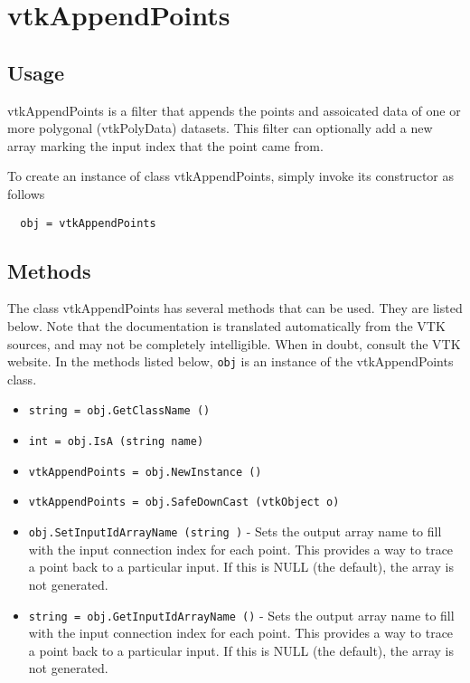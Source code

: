\section{vtkAppendPoints}

\subsection{Usage}

 vtkAppendPoints is a filter that appends the points and assoicated data
 of one or more polygonal (vtkPolyData) datasets. This filter can optionally 
 add a new array marking the input index that the point came from.

To create an instance of class vtkAppendPoints, simply
invoke its constructor as follows
\begin{verbatim}
  obj = vtkAppendPoints
\end{verbatim}
\subsection{Methods}

The class vtkAppendPoints has several methods that can be used.
  They are listed below.
Note that the documentation is translated automatically from the VTK sources,
and may not be completely intelligible.  When in doubt, consult the VTK website.
In the methods listed below, \verb|obj| is an instance of the vtkAppendPoints class.
\begin{itemize}
\item  \verb|string = obj.GetClassName ()|

\item  \verb|int = obj.IsA (string name)|

\item  \verb|vtkAppendPoints = obj.NewInstance ()|

\item  \verb|vtkAppendPoints = obj.SafeDownCast (vtkObject o)|

\item  \verb|obj.SetInputIdArrayName (string )| -  Sets the output array name to fill with the input connection index
 for each point. This provides a way to trace a point back to a
 particular input. If this is NULL (the default), the array is not generated.

\item  \verb|string = obj.GetInputIdArrayName ()| -  Sets the output array name to fill with the input connection index
 for each point. This provides a way to trace a point back to a
 particular input. If this is NULL (the default), the array is not generated.

\end{itemize}
